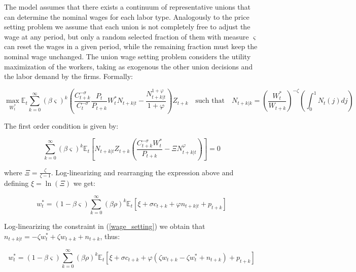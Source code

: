 \documentclass{article}
\newcommand{\Et}{\mathbb{E}_t}
\begin{document}
The model assumes that there exists a continuum of representative unions that can determine the nominal wages for each labor type. Analogously to the price setting problem we assume that each union is not completely free to adjust the wage at any period, but only a random selected fraction of them with measure $\varsigma$ can reset the wages in a given period, while the remaining fraction must keep the nominal wage unchanged. The union wage setting problem considers the utility maximization of the workers, taking as exogenous the other union decisions and the labor demand by the firms. Formally:

\begin{equation}
    \label{wage_setting}
    \max_{W_t^*} \Et \sum^\infty_{k=0} (\beta \varsigma)^k \left( \frac{C_{t+k}^{-\sigma}}{C_t^{-\sigma}} \frac{P_t}{P_{t+k}} W_t^* N_{t+k|t} - \frac{N_{t+k|t}^{1+\varphi}}{1+\varphi} \right)Z_{t+k} \quad \textrm{such that} \quad N_{t+k|k} = \left(\frac{W_t^*}{W_{t+k}} \right)^{-\zeta} \left(\int_0^1 N_t(j) dj \right)
\end{equation}

\begin{minipage}{0.3\textwidth}
    The first order condition is given by:
\end{minipage} 
\begin{minipage}{0.69\textwidth}
    \begin{equation}
        \label{foc_wage}
        \sum^\infty_{k=0} (\beta \varsigma)^k \Et \left[N_{t+k|t} Z_{t+k} \left(\frac{C_{t+k}^{-\sigma} W_t^*}{P_{t+k}} - \Xi N_{t+k|t}^\varphi \right) \right] = 0
    \end{equation}
\end{minipage} 

where $\Xi = \frac{\zeta}{\zeta-1}$. Log-linearizing and rearranging the expression above and defining $\xi = \ln(\Xi)$ we get:

\begin{equation}
    w_t^* = (1 - \beta \varsigma) \sum^\infty_{k=0} (\beta \rho)^k \Et[\xi +  \sigma c_{t+k} + \varphi n_{t+k|t} + p_{t+k}]
\end{equation}


Log-linearizing the constraint in (\ref{wage_setting}) we obtain that $n_{t+k|t} = -\zeta w_t^* + \zeta w_{t+k} + n_{t+k}$, thus:

\begin{equation}
    w_t^* = (1 - \beta \varsigma) \sum^\infty_{k=0} (\beta \rho)^k \Et[\xi +  \sigma c_{t+k} + \varphi( \zeta w_{t+k} -\zeta w_t^* + n_{t+k}) + p_{t+k}]
\end{equation}
\end{document}
